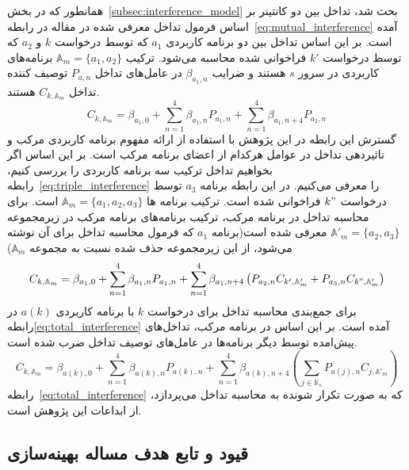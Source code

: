 همانطور که در بخش~\ref{subsec:interference_model} بحث شد، تداخل بین دو کانتینر بر اساس فرمول تداخل معرفی شده در مقاله \cite{medel2023modeling} در رابطه~\eqref{eq:mutual_interference} آمده است. بر این اساس تداخل بین دو برنامه کاربردی $a_1$ که توسط درخواست $k$ و $a_2$ که توسط درخواست $k'$ فراخوانی شده محاسبه می‌شود. ترکیب $\mathbb{A}_m=\{a_1,a_2\}$ برنامه‌های کاربردی در سرور $s$ هستند و ضرایب $\beta_{a_1,n}$ در عامل‌های تداخل $P_{a,n}$ توصیف کننده تداخل $C_{k,\mathbb{A}_m}$ هستند.
\begin{equation} \label{eq:mutual_interference}
    C_{k,\mathbb{A}_m} = \beta_{a_1,0} + \sum_{n=1}^4 \beta_{a_1,n} P_{a_1,n} + \sum_{n=1}^4 \beta_{a_1,n+4} P_{a_2,n}
\end{equation}
گسترش این رابطه در این پژوهش با استفاده از ارائه مفهوم برنامه کاربردی مرکب و تاثیردهی تداخل در عوامل هرکدام از اعضای برنامه مرکب است. بر این اساس اگر بخواهیم تداخل ترکیب سه برنامه کاربردی را بررسی کنیم، رابطه~\eqref{eq:triple_interference} را معرفی می‌کنیم. در این رابطه برنامه $a_3$ توسط درخواست $k"$ فراخوانی شده است. ترکیب برنامه ها $\mathbb{A}_m=\{a_1,a_2,a_3\}$ است. برای محاسبه تداخل در برنامه مرکب، ترکیب برنامه‌های برنامه مرکب در زیرمجموعه $\mathbb{A}'_m=\{a_2,a_3\}$ معرفی شده است(برنامه $a_1$ که فرمول محاسبه تداخل برای آن نوشته می‌شود، از این زیرمجموعه حذف شده نسبت به مجموعه $\mathbb{A}_m$)
\begin{equation} \label{eq:triple_interference}
    C_{k,\mathbb{A}_m} = \beta_{a_1,0} + \sum_{n=1}^4 \beta_{a_1,n} P_{a_1,n} + \sum_{n=1}^4 \beta_{a_1,n+4} \left(P_{a_2,n}C_{k',\mathbb{A}'_m} + P_{a_3,n}C_{k",\mathbb{A}'_m}\right)
\end{equation}
برای جمع‌بندی محاسبه تداخل برای درخواست $k$ با برنامه کاربردی $a(k)$ در رابطه\eqref{eq:total_interference} آمده است. بر این اساس در برنامه مرکب، تداخل‌های پیش‌امده توسط دیگر برنامه‌ها در عامل‌های توصیف تداخل ضرب شده است.
\begin{equation} \label{eq:total_interference}
    C_{k,\mathbb{A}_m} = \beta_{a(k),0} + \sum_{n=1}^4 \beta_{a(k),n} P_{a(k),n} + \sum_{n=1}^4 \beta_{a(k),n+4} \left(\sum_{j \in \mathbb{K}_s} P_{a(j),n} C_{j,\mathbb{A}'_m}\right)
\end{equation}
رابطه~\eqref{eq:total_interference} که به صورت تکرار شونده به محاسبه تداخل می‌پردازد، از ابداعات این پژوهش است.

\subsection{قیود و تابع هدف مساله بهینه‌سازی}

